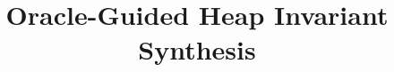 \title{
 Oracle-Guided Heap Invariant Synthesis
}

\ifdefined\DRAFT
 \pagestyle{fancyplain}
 \rhead{\thedate}
\fi


